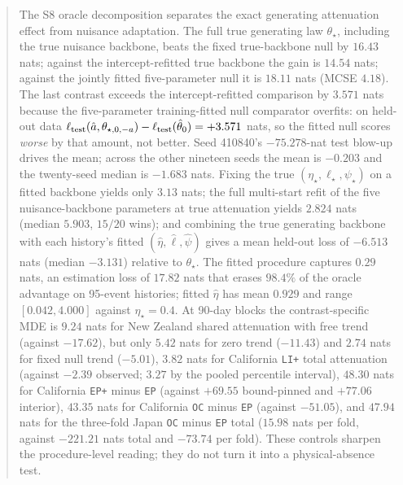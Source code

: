 \begin{abstract}
The S8 oracle decomposition separates the exact generating attenuation effect from nuisance adaptation. The full true generating law $\theta_\star$, including the true nuisance backbone, beats the fixed true-backbone null by $16.43$ nats; against the intercept-refitted true backbone the gain is $14.54$ nats; against the jointly fitted five-parameter null it is $18.11$ nats (MCSE $4.18$). The last contrast exceeds the intercept-refitted comparison by $3.571$ nats because the five-parameter training-fitted null comparator overfits: on held-out data $\ell_{\rm test}(\hat a,\theta_{\star,0,-a})-\ell_{\rm test}(\hat\theta_0)=+3.571$ nats, so the fitted null scores \emph{worse} by that amount, not better. Seed 410840's $-75.278$-nat test blow-up drives the mean; across the other nineteen seeds the mean is $-0.203$ and the twenty-seed median is $-1.683$ nats. Fixing the true $(\eta_\star,\ell_\star,\psi_\star)$ on a fitted backbone yields only $3.13$ nats; the full multi-start refit of the five nuisance-backbone parameters at true attenuation yields $2.824$ nats (median $5.903$, $15/20$ wins); and combining the true generating backbone with each history's fitted $(\hat\eta,\hat\ell,\hat\psi)$ gives a mean held-out loss of $-6.513$ nats (median $-3.131$) relative to $\theta_\star$. The fitted procedure captures $0.29$ nats, an estimation loss of $17.82$ nats that erases $98.4\%$ of the oracle advantage on 95-event histories; fitted $\hat\eta$ has mean $0.929$ and range $[0.042,4.000]$ against $\eta_\star=0.4$. At 90-day blocks the contrast-specific MDE is $9.24$ nats for New Zealand shared attenuation with free trend (against $-17.62$), but only $5.42$ nats for zero trend ($-11.43$) and $2.74$ nats for fixed null trend ($-5.01$), $3.82$ nats for California \texttt{LI+} total attenuation (against $-2.39$ observed; $3.27$ by the pooled percentile interval), $48.30$ nats for California \texttt{EP+} minus \texttt{EP} (against $+69.55$ bound-pinned and $+77.06$ interior), $43.35$ nats for California \texttt{OC} minus \texttt{EP} (against $-51.05$), and $47.94$ nats for the three-fold Japan \texttt{OC} minus \texttt{EP} total ($15.98$ nats per fold, against $-221.21$ nats total and $-73.74$ per fold). These controls sharpen the procedure-level reading; they do not turn it into a physical-absence test.


\end{abstract}
